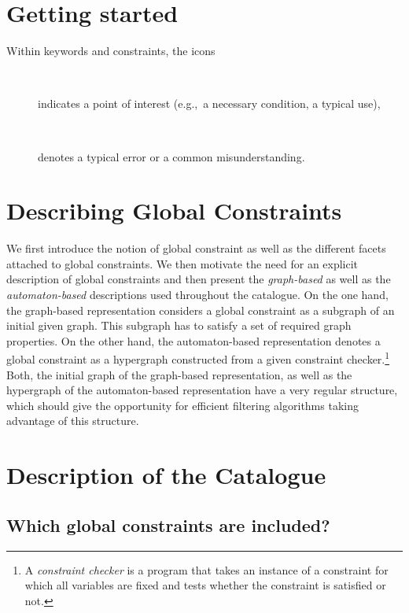 \chapter{Getting started}\label{chap:getting_started}

Within keywords and constraints, the icons
\begin{description}
\item[~~\bclampe] indicates a point of interest (e.g.,~a necessary condition, a typical use),
\item[~~\bcdz] denotes a typical error or a common misunderstanding.
\end{description}

\chapter{Describing Global Constraints}\label{chap:describing_constraints}

\minitoc

We first introduce the notion of global constraint as well as the different facets attached to global constraints. We then motivate the need for an explicit description of global constraints and then present the \emph{graph\nobreakdash-based} as well as the \emph{automaton\nobreakdash-based} descriptions used throughout the catalogue. On the one hand, the graph\nobreakdash-based representation considers a global constraint as a subgraph of an initial given graph. This subgraph has to satisfy a set of required graph properties. On the other hand, the automaton\nobreakdash-based representation denotes a global constraint as a hypergraph constructed from a given constraint checker.\footnote{A \emph{constraint checker} is a program that takes an instance of a constraint for which all variables are fixed and tests whether the constraint is satisfied or not.} Both, the initial graph of the graph\nobreakdash-based representation, as well as the hypergraph of the automaton\nobreakdash-based representation have a very regular structure, which should give the opportunity for efficient filtering algorithms taking advantage of this structure.

\chapter{Description of the Catalogue}\label{chap:describing_catalogue}

\minitoc

\section{Which global constraints are included?}

